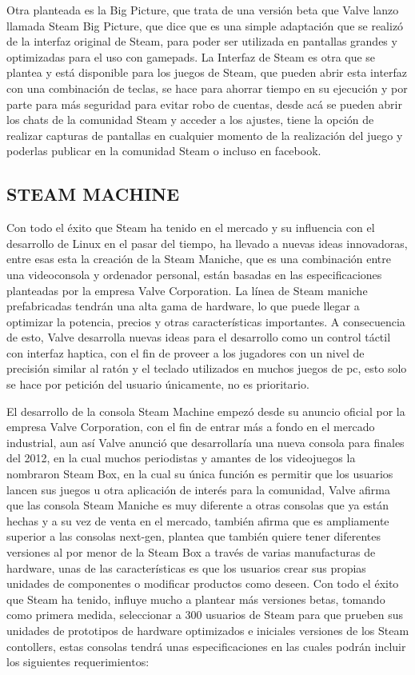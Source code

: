 Otra planteada es la Big Picture, que trata de una versión beta
que Valve lanzo llamada Steam Big Picture, que dice que es una
simple adaptación que se realizó de la interfaz original de
Steam, para poder ser utilizada en pantallas grandes y
optimizadas para el uso con gamepads. La Interfaz de Steam es
otra que se plantea y está disponible para los juegos de Steam,
que pueden abrir esta interfaz con una combinación de teclas, se
hace para ahorrar tiempo en su ejecución y por parte para más
seguridad para evitar robo de cuentas, desde acá se pueden
abrir los chats de la comunidad Steam y acceder a los ajustes,
tiene la opción de realizar capturas de pantallas en cualquier
momento de la realización del juego y poderlas publicar en la
comunidad Steam o incluso en facebook.

\subsection*{STEAM MACHINE}

Con todo el éxito que Steam ha tenido en el mercado y su
influencia con el desarrollo de Linux en el pasar del tiempo, ha
llevado a nuevas ideas innovadoras, entre esas esta la creación
de la Steam Maniche, que es una combinación entre una
videoconsola y ordenador personal, están basadas en las
especificaciones planteadas por la empresa Valve Corporation.
La línea de Steam maniche prefabricadas tendrán una alta gama
de hardware, lo que puede llegar a optimizar la potencia,
precios y otras características importantes. A consecuencia de
esto, Valve desarrolla nuevas ideas para el desarrollo como un
control táctil con interfaz haptica, con el fin de proveer a los
jugadores con un nivel de precisión similar al ratón y el teclado
utilizados en muchos juegos de pc, esto solo se hace por petición
del usuario únicamente, no es prioritario.

El desarrollo de la consola Steam Machine empezó desde su
anuncio oficial por la empresa Valve Corporation, con el fin de
entrar más a fondo en el mercado industrial, aun así Valve
anunció que desarrollaría una nueva consola para finales del
2012, en la cual muchos periodistas y amantes de los
videojuegos la nombraron Steam Box, en la cual su única
función es permitir que los usuarios lancen sus juegos u otra
aplicación de interés para la comunidad, Valve afirma que las
consola Steam Maniche es muy diferente a otras consolas que ya
están hechas y a su vez de venta en el mercado, también afirma
que es ampliamente superior a las consolas next-gen, plantea
que también quiere tener diferentes versiones al por menor de
la Steam Box a través de varias manufacturas de hardware,
unas de las características es que los usuarios crear sus propias
unidades de componentes o modificar productos como deseen.
Con todo el éxito que Steam ha tenido, influye mucho a plantear
más versiones betas, tomando como primera medida,
seleccionar a 300 usuarios de Steam para que prueben sus
unidades de prototipos de hardware optimizados e iniciales
versiones de los Steam contollers, estas consolas tendrá unas
especificaciones en las cuales podrán incluir los siguientes
requerimientos:


